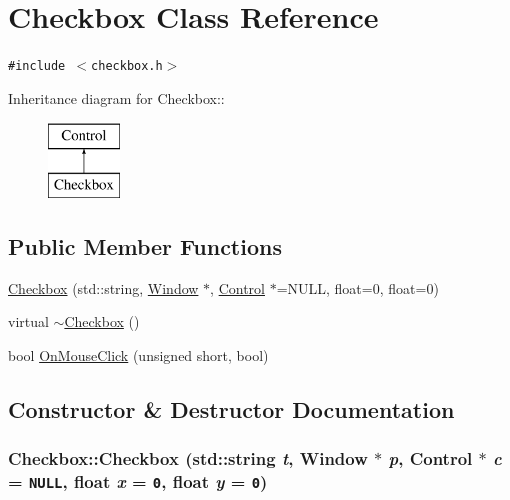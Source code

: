 \hypertarget{class_checkbox}{
\section{Checkbox Class Reference}
\label{class_checkbox}
}
{\tt \#include $<$checkbox.h$>$}

Inheritance diagram for Checkbox::\begin{figure}[H]
\begin{center}
\leavevmode
\includegraphics[height=2cm]{class_checkbox}
\end{center}
\end{figure}
\subsection*{Public Member Functions}
\begin{CompactItemize}
\item 
\hyperlink{class_checkbox_cff218e2ab72c830c807220a5973f36e}{Checkbox} (std::string, \hyperlink{class_window}{Window} $\ast$, \hyperlink{class_control}{Control} $\ast$=NULL, float=0, float=0)
\item 
virtual \hyperlink{class_checkbox_828c1436e32c8be0d9d395286d8e6bfe}{$\sim$Checkbox} ()
\item 
bool \hyperlink{class_checkbox_d017a9602388bab021f25aa502a2f81f}{OnMouseClick} (unsigned short, bool)
\end{CompactItemize}


\subsection{Constructor \& Destructor Documentation}
\hypertarget{class_checkbox_cff218e2ab72c830c807220a5973f36e}{
\subsubsection[{Checkbox}]{\setlength{\rightskip}{0pt plus 5cm}Checkbox::Checkbox (std::string {\em t}, \/  {\bf Window} $\ast$ {\em p}, \/  {\bf Control} $\ast$ {\em c} = {\tt NULL}, \/  float {\em x} = {\tt 0}, \/  float {\em y} = {\tt 0})}}
\label{class_checkbox_cff218e2ab72c830c807220a5973f36e}


